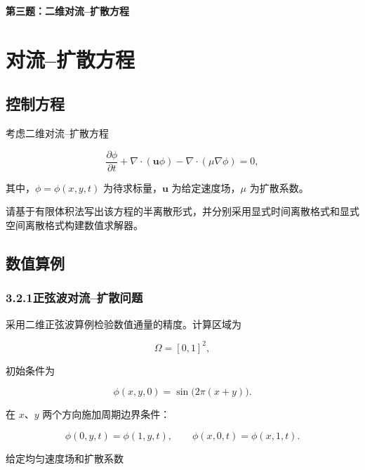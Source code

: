 \documentclass[UTF8,12pt,a4paper,fontset=fandol]{ctexart}
\begin{document}
\begin{center}
  {\LARGE\bfseries 第三题：二维对流--扩散方程}
\end{center}
\vspace{0.8em}

\setcounter{section}{2}
\section{对流--扩散方程}

\subsection{控制方程}

考虑二维对流--扩散方程

\begin{equation}
\frac{\partial\phi}{\partial t}
+\nabla\cdot(\bm{u}\phi)
-\nabla\cdot\left(\mu\nabla\phi\right)=0,
\end{equation}

其中，$\phi=\phi(x,y,t)$ 为待求标量，$\bm{u}$ 为给定速度场，$\mu$ 为扩散系数。

请基于有限体积法写出该方程的半离散形式，并分别采用显式时间离散格式和显式空间离散格式构建数值求解器。

\subsection{数值算例}

\subsubsection{3.2.1\quad 正弦波对流--扩散问题}

采用二维正弦波算例检验数值通量的精度。计算区域为

\begin{equation}
\Omega=[0,1]^2,
\end{equation}

初始条件为

\begin{equation}
\phi(x,y,0)=\sin\bigl(2\pi(x+y)\bigr).
\end{equation}

在 $x$、$y$ 两个方向施加周期边界条件：

\begin{equation}
\phi(0,y,t)=\phi(1,y,t),
\qquad
\phi(x,0,t)=\phi(x,1,t).
\end{equation}

给定均匀速度场和扩散系数
\end{document}

